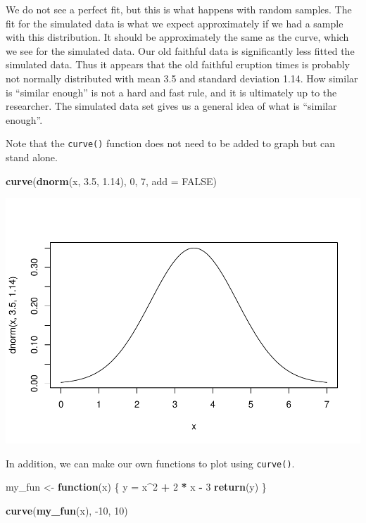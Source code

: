 \documentclass[
]{book}
\newenvironment{Shaded}{\begin{snugshade}}{\end{snugshade}}
\newcommand{\ControlFlowTok}[1]{\textcolor[rgb]{0.13,0.29,0.53}{\textbf{#1}}}
\newcommand{\DataTypeTok}[1]{\textcolor[rgb]{0.13,0.29,0.53}{#1}}
\newcommand{\DecValTok}[1]{\textcolor[rgb]{0.00,0.00,0.81}{#1}}
\newcommand{\FloatTok}[1]{\textcolor[rgb]{0.00,0.00,0.81}{#1}}
\newcommand{\KeywordTok}[1]{\textcolor[rgb]{0.13,0.29,0.53}{\textbf{#1}}}
\newcommand{\NormalTok}[1]{#1}
\newcommand{\OperatorTok}[1]{\textcolor[rgb]{0.81,0.36,0.00}{\textbf{#1}}}
\newcommand{\OtherTok}[1]{\textcolor[rgb]{0.56,0.35,0.01}{#1}}
\newcommand{\StringTok}[1]{\textcolor[rgb]{0.31,0.60,0.02}{#1}}
\begin{document}
We do not see a perfect fit, but this is what happens with random samples. The fit for the simulated data is what we expect approximately if we had a sample with this distribution. It should be approximately the same as the curve, which we see for the simulated data. Our old faithful data is significantly less fitted the simulated data. Thus it appears that the old faithful eruption times is probably not normally distributed with mean 3.5 and standard deviation 1.14. How similar is ``similar enough'' is not a hard and fast rule, and it is ultimately up to the researcher. The simulated data set gives us a general idea of what is ``similar enough''.

Note that the \texttt{curve()} function does not need to be added to graph but can stand alone.

\begin{Shaded}
\begin{Highlighting}[]
\KeywordTok{curve}\NormalTok{(}\KeywordTok{dnorm}\NormalTok{(x, }\FloatTok{3.5}\NormalTok{, }\FloatTok{1.14}\NormalTok{), }\DecValTok{0}\NormalTok{, }\DecValTok{7}\NormalTok{, }\DataTypeTok{add =} \OtherTok{FALSE}\NormalTok{)}
\end{Highlighting}
\end{Shaded}

\includegraphics{_main_files/figure-latex/unnamed-chunk-288-1.pdf}

In addition, we can make our own functions to plot using \texttt{curve()}.

\begin{Shaded}
\begin{Highlighting}[]
\NormalTok{my_fun <-}\StringTok{ }\ControlFlowTok{function}\NormalTok{(x) \{}
\NormalTok{    y =}\StringTok{ }\NormalTok{x}\OperatorTok{^}\DecValTok{2} \OperatorTok{+}\StringTok{ }\DecValTok{2} \OperatorTok{*}\StringTok{ }\NormalTok{x }\OperatorTok{-}\StringTok{ }\DecValTok{3}
    \KeywordTok{return}\NormalTok{(y)}
\NormalTok{\}}

\KeywordTok{curve}\NormalTok{(}\KeywordTok{my_fun}\NormalTok{(x), }\DecValTok{-10}\NormalTok{, }\DecValTok{10}\NormalTok{)}
\end{Highlighting}
\end{Shaded}
\end{document}
